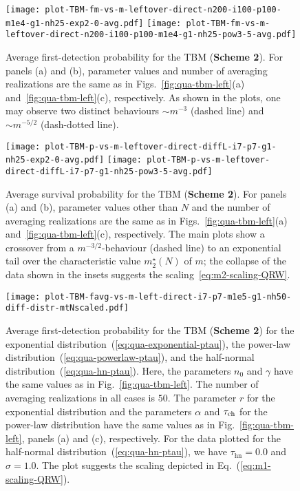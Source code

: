 \documentclass[12pt]{iopart}
\begin{document}
\begin{figure}[!htbp]
\centering
\texttt{[image: plot-TBM-fm-vs-m-leftover-direct-n200-i100-p100-m1e4-g1-nh25-exp2-0-avg.pdf]} \hskip5pt 
\texttt{[image: plot-TBM-fm-vs-m-leftover-direct-n200-i100-p100-m1e4-g1-nh25-pow3-5-avg.pdf]}   
\caption{Average first-detection probability for the TBM (\textbf{Scheme 2}).  For panels (a) and (b), parameter values and number of averaging realizations are the same as in Figs.~\ref{fig:qua-tbm-left}(a) and~\ref{fig:qua-tbm-left}(c), respectively.  As shown in the plots, one may observe two distinct behaviours $\sim m^{-3}$ (dashed line) and $\sim m^{-5/2}$ (dash-dotted line).}
\label{fig:tbm-f-vs-m-exp-pow}
\end{figure}

\begin{figure}[!htbp]
\centering
\texttt{[image: plot-TBM-p-vs-m-leftover-direct-diffL-i7-p7-g1-nh25-exp2-0-avg.pdf]} \hskip1pt 
\texttt{[image: plot-TBM-p-vs-m-leftover-direct-diffL-i7-p7-g1-nh25-pow3-5-avg.pdf]}   
\caption{Average survival probability for the TBM (\textbf{Scheme 2}).  For panels (a) and (b), parameter values other than $N$ and the number of averaging realizations are the same as in Figs.~\ref{fig:qua-tbm-left}(a) and~\ref{fig:qua-tbm-left}(c), respectively.  The main plots show a crossover from a $m^{-3/2}$-behaviour (dashed line) to an exponential tail over the characteristic value $m_2^\star(N)$ of $m$; the collapse of the data shown in the insets suggests the scaling~\eqref{eq:m2-scaling-QRW}.}
\label{fig:tbm-N-dependence}
\end{figure}

\begin{figure}[!htbp]
\centering
\texttt{[image: plot-TBM-favg-vs-m-left-direct-i7-p7-m1e5-g1-nh50-diff-distr-mtNscaled.pdf]}
\caption{Average first-detection probability for the TBM (\textbf{Scheme 2}) for the exponential distribution~(\ref{eq:qua-exponential-ptau}), the power-law distribution~(\ref{eq:qua-powerlaw-ptau}), and the half-normal distribution~(\ref{eq:qua-hn-ptau}).  Here, the parameters $n_0$ and $\gamma$ have the same values as in Fig.~\ref{fig:qua-tbm-left}.  The number of averaging realizations in all cases is $50$.  The parameter $r$ for the exponential distribution and the parameters $\alpha$ and $\tau_{\rm ch}$ for the power-law distribution have the same values as in Fig.~\ref{fig:qua-tbm-left}, panels (a) and (c), respectively.  
For the data plotted for the half-normal distribution~(\ref{eq:qua-hn-ptau}), we have $\tau_{\mathrm{hn}} = 0.0$ and $\sigma=1.0$.
The plot suggests the scaling depicted in Eq.~(\ref{eq:m1-scaling-QRW}). }
\label{fig:tbm-fm}
\end{figure}
\end{document}
